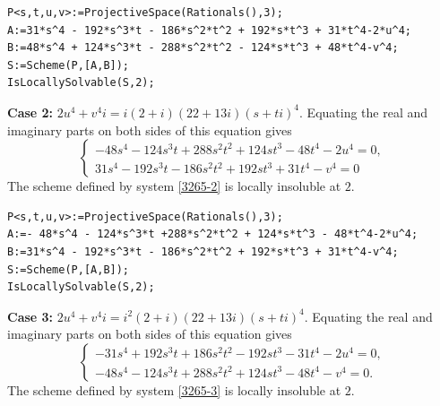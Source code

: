 \documentclass[a4paper,12pt,english,reqno]{amsart}
\begin{document}

\begin{lstlisting}
P<s,t,u,v>:=ProjectiveSpace(Rationals(),3);
A:=31*s^4 - 192*s^3*t - 186*s^2*t^2 + 192*s*t^3 + 31*t^4-2*u^4;
B:=48*s^4 + 124*s^3*t - 288*s^2*t^2 - 124*s*t^3 + 48*t^4-v^4;
S:=Scheme(P,[A,B]);
IsLocallySolvable(S,2);
\end{lstlisting}

{\bf Case 2:} $2u^4+v^4i=i(2+i)(22+13i)(s+ti)^4$. Equating the real and imaginary parts on both sides of this equation gives
\begin{equation}\label{3265-2}
\begin{cases}
-48s^4 - 124s^3t + 288s^2t^2 + 124st^3 - 48t^4 - 2u^4=0,\\
31s^4 - 192s^3t - 186s^2t^2 + 192st^3 + 31t^4 - v^4=0
\end{cases}
\end{equation}
The scheme defined by system \eqref{3265-2} is locally insoluble at $2$.


\begin{lstlisting}
P<s,t,u,v>:=ProjectiveSpace(Rationals(),3);
A:=- 48*s^4 - 124*s^3*t +288*s^2*t^2 + 124*s*t^3 - 48*t^4-2*u^4;
B:=31*s^4 - 192*s^3*t - 186*s^2*t^2 + 192*s*t^3 + 31*t^4-v^4;
S:=Scheme(P,[A,B]);
IsLocallySolvable(S,2);
\end{lstlisting}

{\bf Case 3:} $2u^4+v^4i=i^2(2+i)(22+13i)(s+ti)^4$. Equating the real and imaginary parts on both sides of this equation gives
\begin{equation}\label{3265-3}
\begin{cases}
-31s^4 + 192s^3t + 186s^2t^2 - 192st^3 - 31t^4 - 2u^4=0,\\
-48s^4 - 124s^3t + 288s^2t^2 + 124st^3 - 48t^4 - v^4=0.
\end{cases}
\end{equation}
The scheme defined by system \eqref{3265-3} is locally insoluble at $2$.
\end{document}

